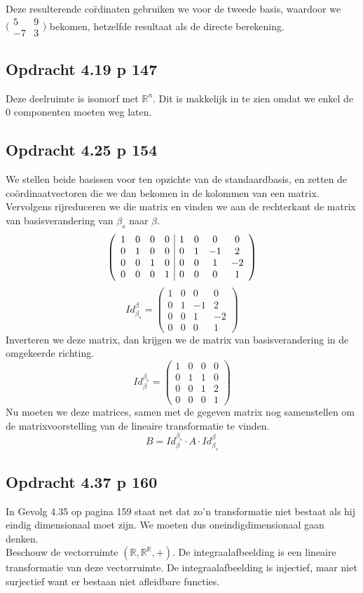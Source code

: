 \documentclass[lineaire_algebra_oplossingen.tex]{subfiles}
\begin{document}
Deze resulterende co\"rdinaten gebruiken we voor de tweede basis, waardoor we $\bigl(
\begin{smallmatrix}
5&9\\ -7&3
\end{smallmatrix}\bigr)$ bekomen, hetzelfde resultaat als de directe berekening.


\subsection{Opdracht 4.19 p 147}
\label{4.19}
Deze deelruimte is isomorf met $\mathbb{R}^n$. Dit is makkelijk in te zien omdat we enkel de $0$ componenten moeten weg laten. 


\subsection{Opdracht 4.25 p 154}
\label{4.25}
We stellen beide basissen voor ten opzichte van de standaardbasis, en zetten de co\"ordinaatvectoren die we dan bekomen in de kolommen van een matrix.
Vervolgens rijreduceren we die matrix en vinden we aan de rechterkant de matrix van basisverandering van $\beta_s$ naar $\beta$.
\[
\left(
\begin{array}{c c c c | c c c c}
1 & 0 & 0 & 0 & 1 & 0 & 0 & 0\\
0 & 1 & 0 & 0 & 0 & 1 & -1 & 2\\
0 & 0 & 1 & 0 & 0 & 0 & 1 & -2\\
0 & 0 & 0 & 1 & 0 & 0 & 0 & 1\\
\end{array}
\right)
\]
\[
Id_{\beta_s}^\beta = 
\begin{pmatrix}
1 & 0 & 0 & 0\\
0 & 1 & -1 & 2\\
0 & 0 & 1 & -2\\
0 & 0 & 0 & 1
\end{pmatrix}
\]
Inverteren we deze matrix, dan krijgen we de matrix van basisverandering in de omgekeerde richting.
\[
Id_{\beta}^{\beta_s} = 
\begin{pmatrix}
1 & 0 & 0 & 0\\
0 & 1 & 1 & 0\\
0 & 0 & 1 & 2\\
0 & 0 & 0 & 1
\end{pmatrix}
\]
Nu moeten we deze matrices, samen met de gegeven matrix nog samenstellen om de matrixvoorstelling van de lineaire transformatie te vinden.
\[
B = Id_{\beta}^{\beta_s}\cdot  A\cdot Id_{\beta_s}^\beta
\]


\subsection{Opdracht 4.37 p 160}
\label{4.37}
In Gevolg 4.35 op pagina 159 staat net dat zo'n transformatie niet bestaat als hij eindig dimensionaal moet zijn. We moeten dus oneindigdimensionaal gaan denken.\\
Beschouw de vectorruimte $(\mathbb{R},\mathbb{R}^\mathbb{R},+)$. De integraalafbeelding is een lineaire transformatie van deze vectorruimte. De integraalafbeelding is injectief, maar niet surjectief want er bestaan niet afleidbare functies.
\end{document}

